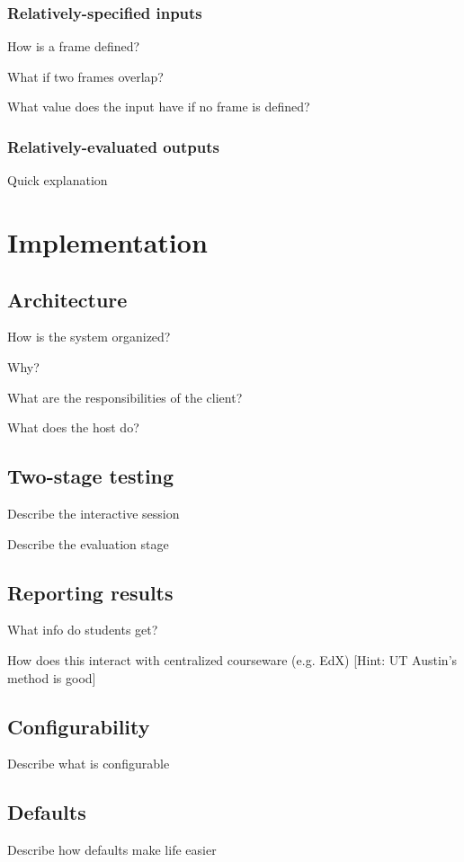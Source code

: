 \documentclass[12pt]{article}
\begin{document}
\subsubsection{Relatively-specified inputs}
How is a frame defined?

What if two frames overlap?

What value does the input have if no frame is defined?

\subsubsection{Relatively-evaluated outputs}
Quick explanation

\newpage
\section{Implementation}

\subsection{Architecture}
How is the system organized?

Why?

What are the responsibilities of the client?

What does the host do?

\subsection{Two-stage testing}
Describe the interactive session

Describe the evaluation stage

\subsection{Reporting results}
What info do students get?

How does this interact with centralized courseware (e.g. EdX) [Hint: UT Austin's method is good]

\subsection{Configurability}
Describe what is configurable

\subsection{Defaults}
Describe how defaults make life easier
\end{document}
